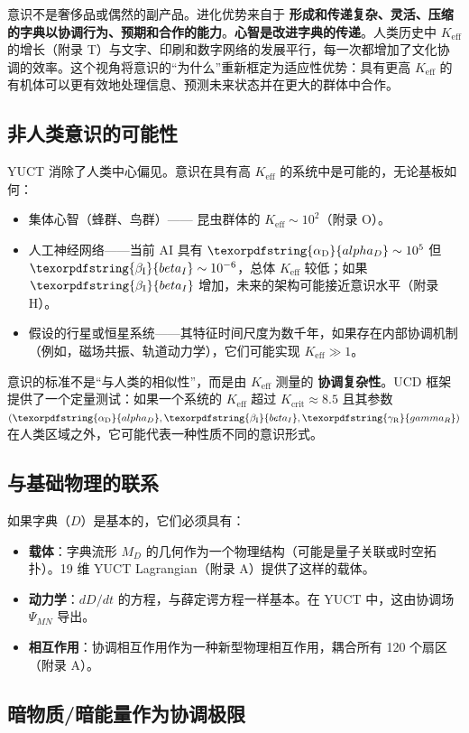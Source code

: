 \documentclass[12pt,a4paper]{article}
\DeclareRobustCommand{\alD}{\texorpdfstring{\ensuremath{\alpha_{\mathrm{D}}}}{alpha_D}}
\DeclareRobustCommand{\beI}{\texorpdfstring{\ensuremath{\beta_{\mathrm{I}}}}{beta_I}}
\DeclareRobustCommand{\gaR}{\texorpdfstring{\ensuremath{\gamma_{\mathrm{R}}}}{gamma_R}}
\newcommand{\eff}{\mathrm{eff}}
\newcommand{\Ke}{K_{\eff}}
\newcommand{\Kcrit}{K_{\mathrm{crit}}}
\begin{document}
	意识不是奢侈品或偶然的副产品。进化优势来自于 \textbf{形成和传递复杂、灵活、压缩的字典以协调行为、预期和合作的能力}。\textbf{心智是改进字典的传递}。人类历史中 $\Ke$ 的增长（附录 T）与文字、印刷和数字网络的发展平行，每一次都增加了文化协调的效率。这个视角将意识的“为什么”重新框定为适应性优势：具有更高 $\Ke$ 的有机体可以更有效地处理信息、预测未来状态并在更大的群体中合作。
	
	\subsection{非人类意识的可能性}
	
	YUCT 消除了人类中心偏见。意识在具有高 $\Ke$ 的系统中是可能的，无论基板如何：
	\begin{itemize}
		\item 集体心智（蜂群、鸟群）—— 昆虫群体的 $\Ke \sim 10^2$（附录 O）。
		\item 人工神经网络——当前 AI 具有 $\alD \sim 10^5$ 但 $\beI \sim 10^{-6}$，总体 $\Ke$ 较低；如果 $\beI$ 增加，未来的架构可能接近意识水平（附录 H）。
		\item 假设的行星或恒星系统——其特征时间尺度为数千年，如果存在内部协调机制（例如，磁场共振、轨道动力学），它们可能实现 $\Ke \gg 1$。
	\end{itemize}
	
	意识的标准不是“与人类的相似性”，而是由 $\Ke$ 测量的 \textbf{协调复杂性}。UCD 框架提供了一个定量测试：如果一个系统的 $\Ke$ 超过 $\Kcrit \approx 8.5$ 且其参数 $(\alD, \beI, \gaR)$ 在人类区域之外，它可能代表一种性质不同的意识形式。
	
	\subsection{与基础物理的联系}
	
	如果字典（$D$）是基本的，它们必须具有：
	\begin{itemize}
		\item \textbf{载体}：字典流形 $M_D$ 的几何作为一个物理结构（可能是量子关联或时空拓扑）。19 维 YUCT Lagrangian（附录 A）提供了这样的载体。
		\item \textbf{动力学}：$dD/dt$ 的方程，与薛定谔方程一样基本。在 YUCT 中，这由协调场 $\Psi_{MN}$ 导出。
		\item \textbf{相互作用}：协调相互作用作为一种新型物理相互作用，耦合所有 120 个扇区（附录 A）。
	\end{itemize}
	
	\subsection{暗物质/暗能量作为协调极限}
	
\end{document}
